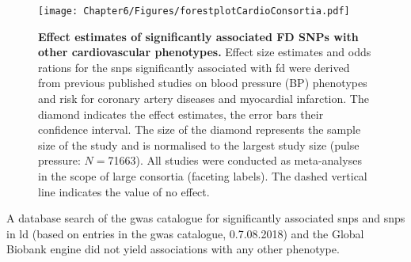 \begin{figure}[hbtp]
	\centering
	\texttt{[image: Chapter6/Figures/forestplotCardioConsortia.pdf]}
	\caption[\textbf{Effect estimates of significantly associated FD SNPs with other cardiovascular phenotypes. }]{\textbf{Effect estimates of significantly associated FD SNPs with other cardiovascular phenotypes. }Effect size estimates and odds rations for the \glspl{snp} significantly associated with \gls{fd} were derived from previous published studies on blood pressure (BP) phenotypes and risk for coronary artery diseases and myocardial infarction. The diamond indicates the effect estimates, the error bars their confidence interval. The size of the diamond represents the sample size of the study and is normalised to the largest study size (pulse pressure: \(N=\)\num{71663}). All studies were conducted as meta-analyses in the scope of large consortia (faceting labels). The dashed vertical line indicates the value of no effect. }
	 	\label{fig:consortia}
\end{figure}
%
A database search of the \gls{gwas} catalogue \citep{MacArthur2017} for significantly associated \glspl{snp} and \glspl{snp} in \gls{ld} (based on entries in the \gls{gwas} catalogue, 0.7.08.2018) and the Global Biobank engine \citep{GBE2017} did not yield associations with any other phenotype. 
